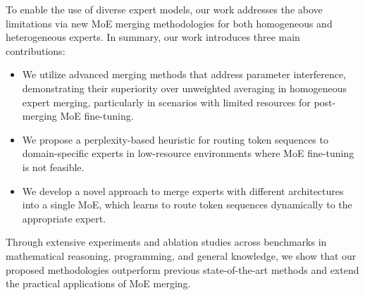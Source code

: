 To enable the use of diverse expert models, our work addresses the above limitations via new MoE merging methodologies for both homogeneous and heterogeneous experts. In summary, our work introduces three main contributions:

\begin{itemize}[leftmargin=*]
    \item We utilize advanced merging methods that address parameter interference, demonstrating their superiority over unweighted averaging in homogeneous expert merging, particularly in scenarios with limited resources for post-merging MoE fine-tuning.
    \item We propose a perplexity-based heuristic for routing token sequences to domain-specific experts in low-resource environments where MoE fine-tuning is not feasible.
    \item We develop a novel approach to merge experts with different architectures into a single MoE, which learns to route token sequences dynamically to the appropriate expert. 
\end{itemize}

Through extensive experiments and ablation studies across benchmarks in mathematical reasoning, programming, and general knowledge, we show that our proposed methodologies outperform previous state-of-the-art methods and extend the practical applications of MoE merging.


